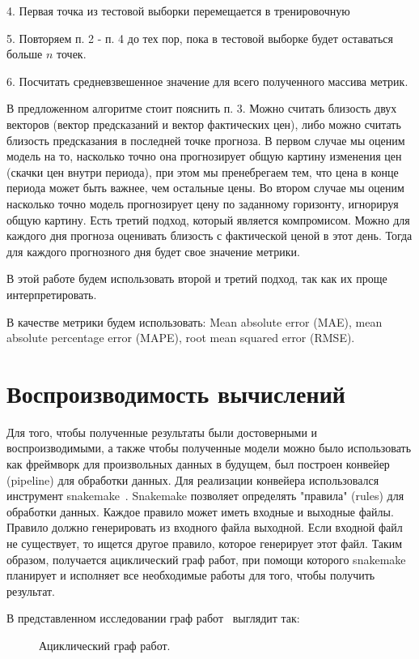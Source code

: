 \documentclass[a4paper,article,14pt]{extarticle}
\begin{document}
4.
Первая точка из тестовой выборки перемещается в тренировочную

5.
Повторяем п. 2 - п. 4 до тех пор, пока в тестовой выборке будет оставаться больше $n$ точек.

6.
Посчитать средневзвешенное значение для всего полученного массива метрик.

В предложенном алгоритме стоит пояснить п. 3.
Можно считать близость двух векторов (вектор предсказаний и вектор фактических цен), либо можно считать близость предсказания в последней точке прогноза.
В первом случае мы оценим модель на то, насколько точно она прогнозирует общую картину изменения цен (скачки цен внутри периода), при этом мы пренебрегаем тем, что цена в конце периода может быть важнее, чем остальные цены.
Во втором случае мы оценим насколько точно модель прогнозирует цену по заданному горизонту, игнорируя общую картину.
Есть третий подход, который является компромисом.
Можно для каждого дня прогноза оценивать близость с фактической ценой в этот день.
Тогда для каждого прогнозного дня будет свое значение метрики.

В этой работе будем использовать второй и третий подход, так как их проще интерпретировать.

В качестве метрики будем использовать: Mean absolute error (MAE), mean absolute percentage error (MAPE), root mean squared error (RMSE).

\section{Воспроизводимость вычислений}

Для того, чтобы полученные результаты были достоверными и воспроизводимыми, а также чтобы полученные модели можно было использовать как фреймворк для произвольных данных в будущем, был построен конвейер (pipeline) для обработки данных.
Для реализации конвейера использовался инструмент snakemake~\cite{snakemake}.
Snakemake позволяет определять "правила" (rules) для обработки данных.
Каждое правило может иметь входные и выходные файлы.
Правило должно генерировать из входного файла выходной.
Если входной файл не существует, то ищется другое правило, которое генерирует этот файл.
Таким образом, получается ациклический граф работ, при помощи которого snakemake планирует и исполняет все необходимые работы для того, чтобы получить результат.

В представленном исследовании граф работ~\cite{graph_dag} выглядит так:
\begin{figure}[ht]
\begin{center}

\caption{
\label{graph_dag}
     Ациклический граф работ.}
\end {center}
\end {figure}
\end{document}
